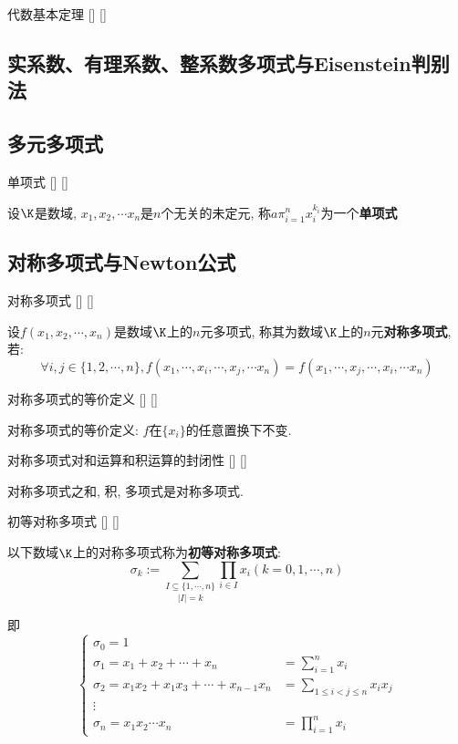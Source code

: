 \documentclass[UTF8]{ctexart}
\begin{document}
		\begin{thm}
			[]
			{代数基本定理}
			[]
			[]


		\end{thm}
	
	\subsection{实系数、有理系数、整系数多项式与Eisenstein判别法}
	
	\subsection{多元多项式}
	
		\begin{dfn}
			[]
			{单项式}
			[]
			[]

			设$\K$是数域, $x_1,x_2,\cdots x_n$是$n$个无关的未定元, 称$a\pi_{i=1}^n x_i^{k_i}$为一个\textbf{单项式}
		\end{dfn}
	
	\subsection{对称多项式与Newton公式}

		\begin{dfn}
			[]
			{对称多项式}
			[]
			[]

			设$f(x_1,x_2,\cdots,x_n)$是数域$\K$上的$n$元多项式, 称其为数域$\K$上的$n$元\textbf{对称多项式}, 若: 
			\[\forall i,j\in\{1,2,\cdots,n\}, f(x_1,\cdots,x_i,\cdots,x_j,\cdots x_n)=f(x_1,\cdots,x_j,\cdots,x_i,\cdots x_n)\]
		\end{dfn}

		\begin{ppt}
			[]
			{对称多项式的等价定义}
			[]
			[]

			对称多项式的等价定义: $f$在$\{x_i\}$的任意置换下不变. 
		\end{ppt}
		
		\begin{ppt}
			[]
			{对称多项式对和运算和积运算的封闭性}
			[]
			[]

			对称多项式之和, 积, 多项式是对称多项式. 
		\end{ppt}
		
		\begin{dfn}
			[]
			{初等对称多项式}
			[]
			[]

			以下数域$\K$上的对称多项式称为\textbf{初等对称多项式}: 
			\[\sigma_k:=\underset{|I|=k}{\sum_{I\subseteq\{1,\cdots,n\}}}\prod_{i\in I} x_i(k=0,1,\cdots,n)\]
			
			即
			\[\begin{cases}
				\sigma_0=1\\
				\sigma_1=x_1+x_2+\cdots+x_n & =\sum\limits_{i=1}^n x_i\\
				\sigma_2=x_1 x_2+x_1 x_3+\cdots+x_{n-1}x_n & =\sum\limits_{1\leq i<j\leq n}x_i x_j\\
				\vdots\\
				\sigma_n=x_1 x_2 \cdots x_n & =\prod\limits_{i=1}^n x_i
			\end{cases}\]
		\end{dfn}
		
\end{document}
